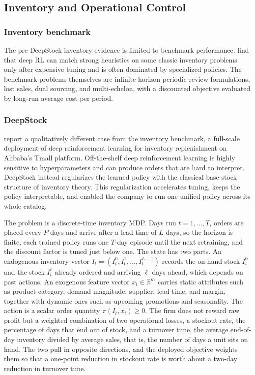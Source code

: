 \subsection{Inventory and Operational Control}
\label{sec:inventory}

\subsubsection{Inventory benchmark}
The pre-DeepStock inventory evidence is limited to benchmark performance. \citet{Gijsbrechts2022inventory} find that deep RL can match strong heuristics on some classic inventory problems only after expensive tuning and is often dominated by specialized policies. The benchmark problems themselves are infinite-horizon periodic-review formulations, lost sales, dual sourcing, and multi-echelon, with a discounted objective evaluated by long-run average cost per period.

\subsubsection{DeepStock}
\citet{Xie2026DeepStock} report a qualitatively different case from the inventory benchmark, a full-scale deployment of deep reinforcement learning for inventory replenishment on Alibaba's Tmall platform. Off-the-shelf deep reinforcement learning is highly sensitive to hyperparameters and can produce orders that are hard to interpret. DeepStock instead regularizes the learned policy with the classical base-stock structure of inventory theory. This regularization accelerates tuning, keeps the policy interpretable, and enabled the company to run one unified policy across its whole catalog.

The problem is a discrete-time inventory MDP. Days run $t=1,\dots,T$, orders are placed every $P$ days and arrive after a lead time of $L$ days, so the horizon is finite, each trained policy runs one $T$-day episode until the next retraining, and the discount factor is tuned just below one. The state has two parts. An endogenous inventory vector $I_t=(I_t^{0},I_t^{1},\dots,I_t^{L-1})$ records the on-hand stock $I_t^{0}$ and the stock $I_t^{\ell}$ already ordered and arriving $\ell$ days ahead, which depends on past actions. An exogenous feature vector $x_t\in\mathbb{R}^{m}$ carries static attributes such as product category, demand magnitude, supplier, lead time, and margin, together with dynamic ones such as upcoming promotions and seasonality. The action is a scalar order quantity $\pi(I_t,x_t)\ge 0$. The firm does not reward raw profit but a weighted combination of two operational losses, a stockout rate, the percentage of days that end out of stock, and a turnover time, the average end-of-day inventory divided by average sales, that is, the number of days a unit sits on hand. The two pull in opposite directions, and the deployed objective weights them so that a one-point reduction in stockout rate is worth about a two-day reduction in turnover time.

